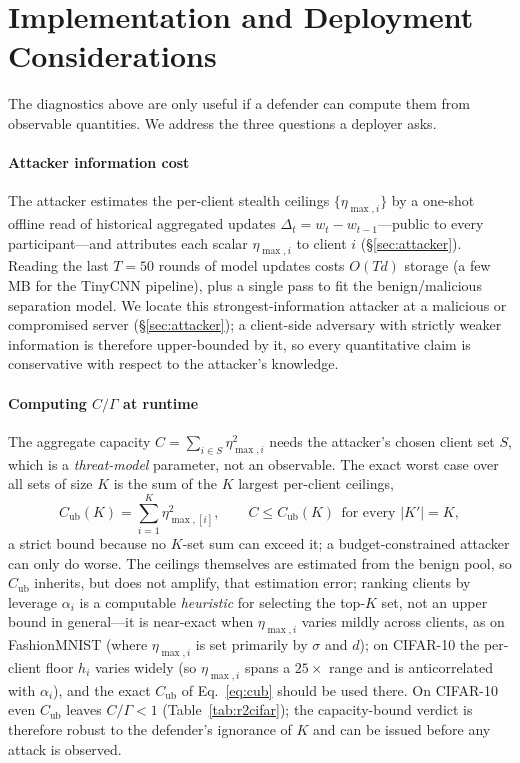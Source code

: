 \documentclass[final,1p,times]{elsarticle}
\begin{document}
\section{Implementation and Deployment Considerations}
The diagnostics above are only useful if a defender can compute them from
observable quantities. We address the three questions a deployer asks.

\paragraph{Attacker information cost}
The attacker estimates the per-client stealth ceilings
$\{\eta_{\max,i}\}$ by a one-shot offline read of historical aggregated
updates $\Delta_t=w_t-w_{t-1}$---public to every participant---and
attributes each scalar $\eta_{\max,i}$ to client $i$
(\S\ref{sec:attacker}). Reading the last $T{=}50$ rounds of model
updates costs $O(Td)$ storage (a few MB for the TinyCNN pipeline), plus a
single pass to fit the benign/malicious separation model. We locate this
strongest-information attacker at a malicious or compromised server
(\S\ref{sec:attacker}); a client-side adversary with strictly weaker
information is therefore upper-bounded by it, so every quantitative claim
is conservative with respect to the attacker's knowledge.

\paragraph{Computing $C/\Gamma$ at runtime}
The aggregate capacity $C{=}\sum_{i\in S}\eta_{\max,i}^2$ needs the
attacker's chosen client set $S$, which is a \emph{threat-model}
parameter, not an observable. The exact worst case over all sets of
size $K$ is the sum of the $K$ largest per-client ceilings,
\begin{equation}\label{eq:cub}
C_{\mathrm{ub}}(K)=\textstyle\sum_{i=1}^{K}\eta_{\max,[i]}^2,
\qquad C\le C_{\mathrm{ub}}(K)\ \ \text{for every } |K'|=K,
\end{equation}
a strict bound because no $K$-set sum can exceed it; a budget-constrained
attacker can only do worse. The ceilings themselves are estimated from
the benign pool, so $C_{\mathrm{ub}}$ inherits, but does not amplify,
that estimation error; ranking clients by leverage $\alpha_i$ is a
computable \emph{heuristic} for selecting the top-$K$ set, not an upper
bound in general---it is near-exact when $\eta_{\max,i}$ varies mildly across clients, as on
FashionMNIST (where $\eta_{\max,i}$ is set primarily by $\sigma$ and
$d$); on CIFAR-10 the per-client floor $h_i$ varies widely (so
$\eta_{\max,i}$ spans a $25\times$ range and is anticorrelated with
$\alpha_i$), and the exact $C_{\mathrm{ub}}$ of Eq.~\ref{eq:cub} should
be used there. On CIFAR-10 even
$C_{\mathrm{ub}}$ leaves $C/\Gamma{<}1$ (Table~\ref{tab:r2cifar}); the
capacity-bound verdict is therefore robust to the defender's ignorance
of $K$ and can be issued before any attack is observed.
\end{document}
